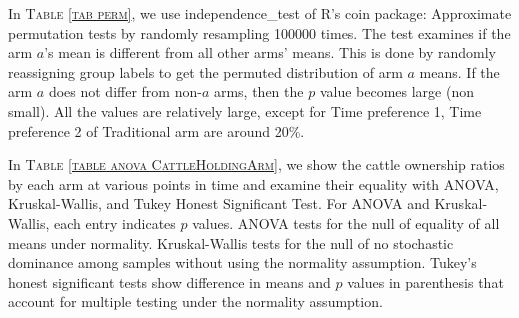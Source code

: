 \vspace{2ex}





In \textsc{\normalsize Table \ref{tab perm}}, we use \textsf{independence\_test} of \textsf{R}'s \textsf{coin} package: Approximate permutation tests by randomly resampling 100000 times. The test examines if the arm $a$'s mean is different from all other arms' means. This is done by randomly reassigning group labels to get the permuted distribution of arm $a$ means. If the arm $a$ does not differ from non-$a$ arms, then the $p$ value becomes large (non small). All the values are relatively large, except for \textsf{Time preference 1, Time preference 2} of \textsf{Traditional} arm are around 20\%.

In \textsc{\normalsize Table \ref{table anova CattleHoldingArm}}, we show the cattle ownership ratios by each arm  at various points in time and examine their equality with ANOVA, Kruskal-Wallis, and Tukey Honest Significant Test. For ANOVA and Kruskal-Wallis, each entry indicates $p$ values. ANOVA tests for the null of equality of all means under normality. Kruskal-Wallis tests for the null of no stochastic dominance among samples without using the normality assumption. Tukey's honest significant tests show difference in means and $p$ values in parenthesis that account for multiple testing under the normality assumption.  

